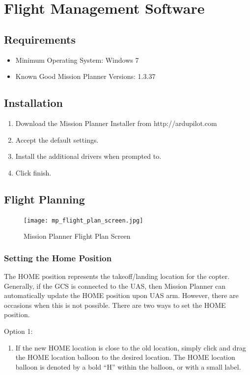 \documentclass{report}
\begin{document}
\chapter{Flight Management Software}
	\label{chap:FMS}
	\section{Requirements}
		\begin{itemize}
			\item Minimum Operating System: Windows 7
			\item Known Good Mission Planner Versions: 1.3.37
		\end{itemize}
	\section{Installation}
		\begin{enumerate}
			\item Download the Mission Planner Installer from http://ardupilot.com
			\item Accept the default settings.
			\item Install the additional drivers when prompted to.
			\item Click finish.
		\end{enumerate}
	\section{Flight Planning}
		\begin{figure}[ht]
			\centering
			\caption{Mission Planner Flight Plan Screen}
			\texttt{[image: mp\_flight\_plan\_screen.jpg]}
			\label{fig:mp_flight_plan}
		\end{figure}
		\subsection{Setting the Home Position}
			The HOME position represents the takeoff/landing location for the copter.  Generally, if the \gls{GCS} is connected to the \gls{UAS}, then Mission Planner can automatically update the HOME position upon \gls{UAS} arm.  However, there are occasions when this is not possible.  There are two ways to set the HOME position.

			Option 1:
			\begin{enumerate}
				\item If the new HOME location is close to the old location, simply click and drag the HOME location balloon to the desired location.  The HOME location balloon is denoted by a bold ``H'' within the balloon, or with a small label.
			\end{enumerate}
\end{document}
